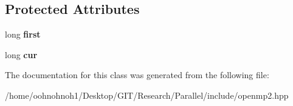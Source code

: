 \subsection*{Protected Attributes}
\begin{DoxyCompactItemize}
\item 
\mbox{\label{classProgression_a3846cba453b88d1ea89d94c41d7a6fe3}} 
long {\bfseries first}
\item 
\mbox{\label{classProgression_ab1794ef4de7de380bda5e9c09a785126}} 
long {\bfseries cur}
\end{DoxyCompactItemize}


The documentation for this class was generated from the following file\+:\begin{DoxyCompactItemize}
\item 
/home/oohnohnoh1/\+Desktop/\+G\+I\+T/\+Research/\+Parallel/include/openmp2.\+hpp\end{DoxyCompactItemize}
